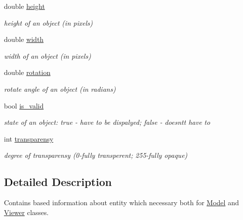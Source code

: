 \begin{DoxyCompactItemize}
\mbox{\label{class_object_a811bf2cbf614c4f0a3935a83fb639ffd}} 
double \hyperlink{class_object_a811bf2cbf614c4f0a3935a83fb639ffd}{height}
\begin{DoxyCompactList}\small\item\em height of an object (in pixels) \end{DoxyCompactList}\item 
\mbox{\label{class_object_a3afad0ab476968e517b6f48c2a32719f}} 
double \hyperlink{class_object_a3afad0ab476968e517b6f48c2a32719f}{width}
\begin{DoxyCompactList}\small\item\em width of an object (in pixels) \end{DoxyCompactList}\item 
\mbox{\label{class_object_afb2fc6bd0f2d6e62901f6b68ac7dfbc8}} 
double \hyperlink{class_object_afb2fc6bd0f2d6e62901f6b68ac7dfbc8}{rotation}
\begin{DoxyCompactList}\small\item\em rotate angle of an object (in radians) \end{DoxyCompactList}\item 
\mbox{\label{class_object_ae0881e8e5fd72a025663b048f2444555}} 
bool \hyperlink{class_object_ae0881e8e5fd72a025663b048f2444555}{is\+\_\+valid}
\begin{DoxyCompactList}\small\item\em state of an object\+: \textquotesingle{}true\textquotesingle{} -\/ have to be dispalyed; \textquotesingle{}false\textquotesingle{} -\/ doesnt\textquotesingle{}t have to \end{DoxyCompactList}\item 
\mbox{\label{class_object_aff7027899040a66fc27b9c059f9c13f0}} 
int \hyperlink{class_object_aff7027899040a66fc27b9c059f9c13f0}{transparensy}
\begin{DoxyCompactList}\small\item\em degree of transparensy (0-\/fully transperent; 255-\/fully opaque) \end{DoxyCompactList}\end{DoxyCompactItemize}


\subsection{Detailed Description}
Contains based information about entity which necessary both for \hyperlink{class_model}{Model} and \hyperlink{class_viewer}{Viewer} classes. 

